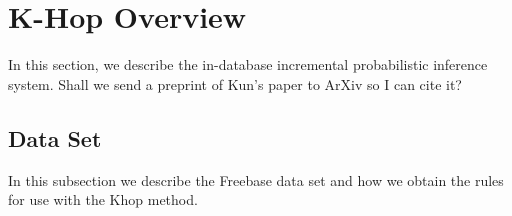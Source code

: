 
\section{K-Hop Overview}

In this section, we describe the in-database incremental probabilistic inference system.
Shall we send a preprint of Kun's paper to ArXiv so I can cite it?

\subsection{Data Set}
In this subsection we describe the Freebase data set and how we obtain the rules for use with the Khop method.
